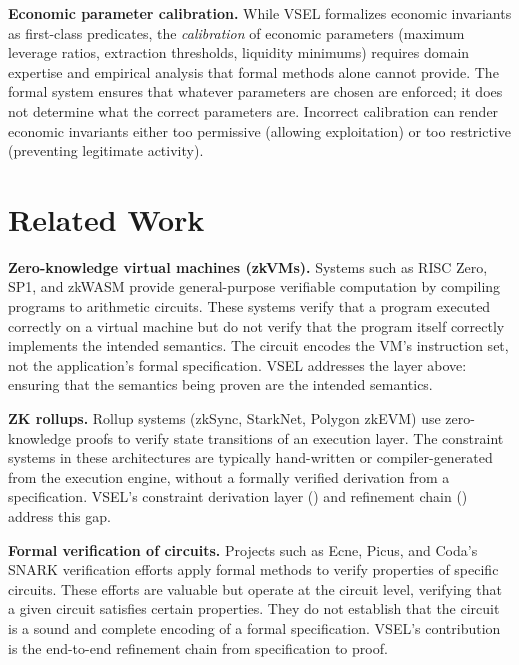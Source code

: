 \documentclass[11pt,a4paper]{article}
\theoremstyle{definition}
\begin{document}
\noindent\textbf{Economic parameter calibration.} While VSEL formalizes economic invariants as first-class predicates, the \emph{calibration} of economic parameters (maximum leverage ratios, extraction thresholds, liquidity minimums) requires domain expertise and empirical analysis that formal methods alone cannot provide. The formal system ensures that whatever parameters are chosen are enforced; it does not determine what the correct parameters are. Incorrect calibration can render economic invariants either too permissive (allowing exploitation) or too restrictive (preventing legitimate activity).

\section{Related Work}
\label{sec:related-work}

\noindent\textbf{Zero-knowledge virtual machines (zkVMs).} Systems such as RISC Zero, SP1, and zkWASM provide general-purpose verifiable computation by compiling programs to arithmetic circuits. These systems verify that a program executed correctly on a virtual machine but do not verify that the program itself correctly implements the intended semantics. The circuit encodes the VM's instruction set, not the application's formal specification. VSEL addresses the layer above: ensuring that the semantics being proven are the intended semantics.

\noindent\textbf{ZK rollups.} Rollup systems (zkSync, StarkNet, Polygon zkEVM) use zero-knowledge proofs to verify state transitions of an execution layer. The constraint systems in these architectures are typically hand-written or compiler-generated from the execution engine, without a formally verified derivation from a specification. VSEL's constraint derivation layer () and refinement chain () address this gap.

\noindent\textbf{Formal verification of circuits.} Projects such as Ecne, Picus, and Coda's SNARK verification efforts apply formal methods to verify properties of specific circuits. These efforts are valuable but operate at the circuit level, verifying that a given circuit satisfies certain properties. They do not establish that the circuit is a sound and complete encoding of a formal specification. VSEL's contribution is the end-to-end refinement chain from specification to proof.
\end{document}
